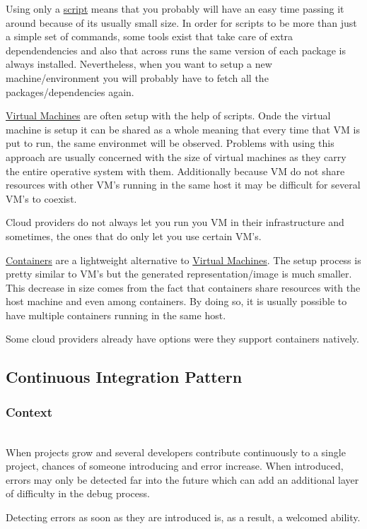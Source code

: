 \documentclass{llncs}
\begin{document}
			Using only a \underline{script} means that you probably will have an easy time passing it around because of its usually small size. In order for scripts to be more than just a simple set of commands, some tools exist that take care of extra dependendencies and also that across runs the same version of each package is always installed. Nevertheless, when you want to setup a new machine/environment you will probably have to fetch all the packages/dependencies again.

			\underline{Virtual Machines} are often setup with the help of scripts. Onde the virtual machine is setup it can be shared as a whole meaning that every time that VM is put to run, the same environmet will be observed. Problems with using this approach are usually concerned with the size of virtual machines as they carry the entire operative system with them. Additionally because VM do not share resources with other VM's running in the same host it may be difficult for several VM's to coexist.

			Cloud providers do not always let you run you VM in their infrastructure and sometimes, the ones that do only let you use certain VM's.

			\underline{Containers} are a lightweight alternative to \underline{Virtual Machines}. The setup process is pretty similar to VM's but the generated representation/image is much smaller. This decrease in size comes from the fact that containers share resources with the host machine and even among containers. By doing so, it is usually possible to have multiple containers running in the same host.

			Some cloud providers already have options were they support containers natively.
	\subsection{Continuous Integration Pattern}
		\subsubsection{Context}~\\
			When projects grow and several developers contribute continuously to a single project, chances of someone introducing and error increase. When introduced, errors may only be detected far into the future which can add an additional layer of difficulty in the debug process.

			Detecting errors as soon as they are introduced is, as a result, a welcomed ability.
\end{document}

